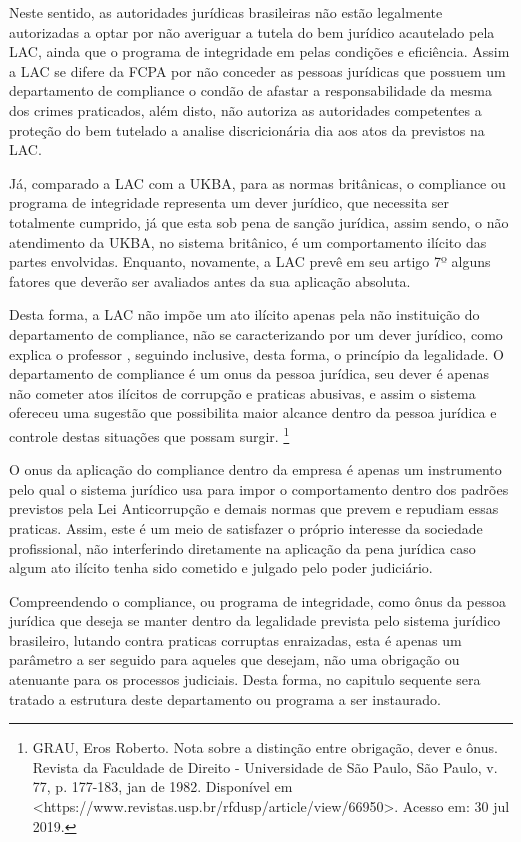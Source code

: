 Neste sentido, as autoridades jurídicas brasileiras não estão legalmente autorizadas a optar por não averiguar a tutela do bem jurídico acautelado pela LAC, ainda que o programa de integridade em pelas condições e eficiência. Assim a LAC se difere da FCPA por não conceder as pessoas jurídicas que possuem um departamento de compliance o condão de afastar a responsabilidade da mesma dos crimes praticados, além disto, não autoriza as autoridades competentes a proteção do bem tutelado a analise discricionária 
dia aos atos da previstos na LAC. 

Já, comparado a LAC com a UKBA, para as normas britânicas, o compliance ou programa de integridade representa um dever jurídico, que necessita ser totalmente cumprido, já que esta sob pena de sanção jurídica, assim sendo, o não atendimento da UKBA, no sistema britânico, é um comportamento ilícito das partes envolvidas. Enquanto, novamente, a LAC prevê em seu artigo 7º alguns fatores que deverão ser avaliados antes da sua aplicação absoluta. 

Desta forma, a LAC não impõe um ato ilícito apenas pela não instituição do departamento de compliance, não se caracterizando por um dever jurídico, como explica o professor \cite{RobertoOnus}, seguindo inclusive, desta forma, o princípio da legalidade. O departamento de compliance é um onus da pessoa jurídica, seu dever é apenas não cometer atos ilícitos de corrupção e praticas abusivas, e assim o sistema ofereceu uma sugestão que possibilita maior alcance dentro da pessoa jurídica e controle destas situações que possam surgir. \footnote{GRAU, Eros Roberto. Nota sobre a distinção entre obrigação, dever e ônus. Revista da Faculdade de Direito - Universidade de São Paulo, São Paulo, v. 77, p. 177-183, jan de 1982. Disponível em <https://www.revistas.usp.br/rfdusp/article/view/66950>. Acesso em: 30 jul 2019.}


O onus da aplicação do compliance dentro da empresa é apenas um instrumento pelo qual o sistema jurídico usa para impor o comportamento dentro dos padrões previstos pela Lei Anticorrupção e demais normas que prevem e repudiam essas praticas. Assim, este é  um meio de satisfazer o próprio interesse da sociedade profissional, não interferindo diretamente na aplicação da pena jurídica caso algum ato ilícito tenha sido cometido e julgado pelo poder judiciário.

Compreendendo o compliance, ou programa de integridade, como ônus da pessoa jurídica que deseja se manter dentro da legalidade prevista pelo sistema jurídico brasileiro, lutando contra praticas corruptas enraizadas, esta é apenas um parâmetro a ser seguido para aqueles que desejam, não uma obrigação ou atenuante para os processos judiciais. Desta forma, no capitulo sequente sera tratado a estrutura deste departamento ou programa a ser instaurado. 



